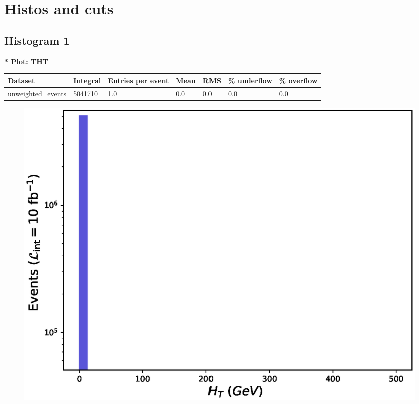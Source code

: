 \documentclass[a4paper, 10pt]{article}
\begin{document}
\newpage
\section{ Histos and cuts}

\subsection{ Histogram 1}

\textbf{* Plot: THT}\\
   \begin{table}[H]
  \begin{center}
    \begin{tabular}{|m{23.0mm}|m{23.0mm}|m{18.0mm}|m{19.0mm}|m{19.0mm}|m{19.0mm}|m{19.0mm}|}
      \hline
      {\cellcolor{yellow}         Dataset}& {\cellcolor{yellow}         Integral}& {\cellcolor{yellow}         Entries per event}& {\cellcolor{yellow}         Mean}& {\cellcolor{yellow}         RMS}& {\cellcolor{yellow}         \% underflow}& {\cellcolor{yellow}         \% overflow}\\
      \hline
      {\cellcolor{white}         unweighted\_events}& {\cellcolor{white}         5041710}& {\cellcolor{white}         1.0}& {\cellcolor{white}         0.0}& {\cellcolor{white}         0.0}& {\cellcolor{green}         0.0}& {\cellcolor{green}         0.0}\\
\hline
    \end{tabular}
  \end{center}
\end{table}

\begin{figure}[H]
  \begin{center}
    \includegraphics[scale=0.45]{selection_0.eps}\\
\caption{   }
  \end{center}
\end{figure}
      \newpage
\end{document}
